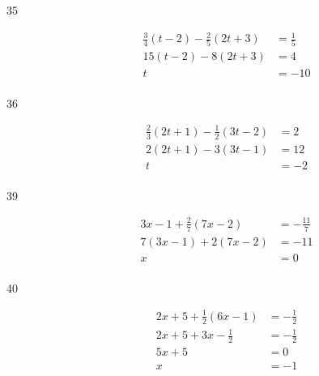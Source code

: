 \documentclass[letterpaper, landscape]{exam}
\begin{document}
\begin{description}
      \item[35]
        \begin{align*}
          \frac{3}{4}(t - 2) - \frac{2}{5}(2t + 3) & = \frac{1}{5} \\
          15(t - 2) - 8(2t + 3)                    & = 4 \\
          t                                        & = \boxed{ -10 } \\
        \end{align*}

      \item[36] 
        \begin{align*}
          \frac{2}{3} (2t + 1) - \frac{1}{2} (3t - 2) & = 2 \\
          2(2t + 1) - 3(3t - 1)                       & = 12 \\
          t                                           & = \boxed{ -2 } \\
        \end{align*}


      \item[39]
        \begin{align*}
          3x - 1 + \frac{2}{7}(7x - 2) & = - \frac{11}{7} \\
          7(3x - 1) + 2(7x - 2)        & = -11 \\
          x                            & = \boxed{ 0 } \\
        \end{align*}

      \item[40]
        \begin{align*}
          2x + 5 + \frac{1}{2}(6x - 1) & = -\frac{1}{2} \\
          2x + 5 + 3x - \frac{1}{2}    & = -\frac{1}{2} \\
          5x + 5                       & = 0 \\
          x                            & = \boxed{ -1 } \\
        \end{align*}


\end{description}
\end{document}

